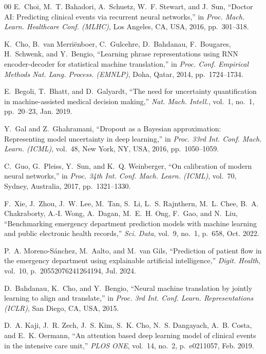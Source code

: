 \documentclass[runningheads]{llncs}
\begin{document}
\begin{thebibliography}{00}
E.~Choi, M.~T. Bahadori, A.~Schuetz, W.~F. Stewart, and J.~Sun, ``Doctor AI: Predicting clinical events via recurrent neural networks,'' in \textit{Proc. Mach. Learn. Healthcare Conf. (MLHC)}, Los Angeles, CA, USA, 2016, pp.~301--318.

K.~Cho, B.~van Merri\"{e}nboer, C.~Gulcehre, D.~Bahdanau, F.~Bougares, H.~Schwenk, and Y.~Bengio, ``Learning phrase representations using RNN encoder-decoder for statistical machine translation,'' in \textit{Proc. Conf. Empirical Methods Nat. Lang. Process. (EMNLP)}, Doha, Qatar, 2014, pp.~1724--1734.

E.~Begoli, T.~Bhatt, and D.~Galyardt, ``The need for uncertainty quantification in machine-assisted medical decision making,'' \textit{Nat. Mach. Intell.}, vol.~1, no.~1, pp.~20--23, Jan. 2019.

Y.~Gal and Z.~Ghahramani, ``Dropout as a Bayesian approximation: Representing model uncertainty in deep learning,'' in \textit{Proc. 33rd Int. Conf. Mach. Learn. (ICML)}, vol.~48, New York, NY, USA, 2016, pp.~1050--1059.

C.~Guo, G.~Pleiss, Y.~Sun, and K.~Q. Weinberger, ``On calibration of modern neural networks,'' in \textit{Proc. 34th Int. Conf. Mach. Learn. (ICML)}, vol.~70, Sydney, Australia, 2017, pp.~1321--1330.

F.~Xie, J.~Zhou, J.~W. Lee, M.~Tan, S.~Li, L.~S. Rajnthern, M.~L. Chee, B.~A. Chakraborty, A.-I. Wong, A.~Dagan, M.~E.~H. Ong, F.~Gao, and N.~Liu, ``Benchmarking emergency department prediction models with machine learning and public electronic health records,'' \textit{Sci. Data}, vol.~9, no.~1, p.~658, Oct. 2022.

P.~A. Moreno-S\'{a}nchez, M.~Aalto, and M.~van Gils, ``Prediction of patient flow in the emergency department using explainable artificial intelligence,'' \textit{Digit. Health}, vol.~10, p.~20552076241264194, Jul. 2024.

D.~Bahdanau, K.~Cho, and Y.~Bengio, ``Neural machine translation by jointly learning to align and translate,'' in \textit{Proc. 3rd Int. Conf. Learn. Representations (ICLR)}, San Diego, CA, USA, 2015.

D.~A. Kaji, J.~R. Zech, J.~S. Kim, S.~K. Cho, N.~S. Dangayach, A.~B. Costa, and E.~K. Oermann, ``An attention based deep learning model of clinical events in the intensive care unit,'' \textit{PLOS ONE}, vol.~14, no.~2, p.~e0211057, Feb. 2019.


\end{thebibliography}
\end{document}
